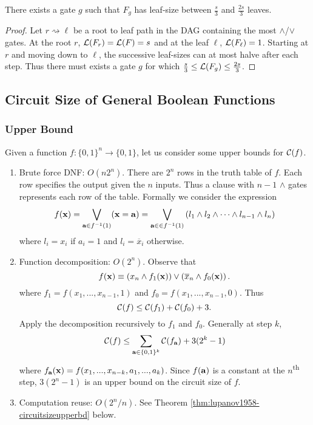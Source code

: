 \documentclass[11pt]{article}
\begin{document}
	\begin{claim}
		\label{claim:pickgoodgate}
		There exists a gate $g$ such that $F_g$ has leaf-size between $\frac{s}{3}$ and $\frac{2s}{3}$ leaves.
	\end{claim}
	\begin{proof}
		Let $r \rightsquigarrow \ell$ be a root to leaf path in the DAG containing the most $\land$/$\lor$ gates. At the root $r$, $\mathcal{L}(F_r) = \mathcal{L}(F) = s$ and at the leaf $\ell$, $\mathcal{L}(F_{\ell}) = 1$. Starting at $r$ and moving down to $\ell$, the successive leaf-sizes can at most halve after each step. Thus there must exists a gate $g$ for which $\frac{s}{3} \leq \mathcal{L}(F_g) \leq \frac{2s}{3}$.
	\end{proof}
	
	\subsection{Circuit Size of General Boolean Functions}
	\label{ssec:circuitsize}
	
	\subsubsection{Upper Bound}
	\label{sssec:circuitsizeupperbd}
	Given a function $f: \{0,1\}^n \rightarrow \{0,1\}$, let us consider some upper bounds for $\mathcal{C}(f)$.
	\begin{enumerate}
		\item Brute force DNF: $O(n2^n)$. There are $2^n$ rows in the truth table of $f$. Each row specifies the output given the $n$ inputs. Thus a clause with $n-1$ $\land$ gates represents each row of the table. Formally we consider the expression
		\[f(\mathbf{x}) = \bigvee_{\mathbf{a} \in f^{-1}(1)} (\mathbf{x} = \mathbf{a}) = \bigvee_{\mathbf{a} \in  \in f^{-1}(1)} \left(l_1 \land l_2 \land \cdots \land l_{n-1} \land l_n\right)\]
		where $l_i = x_i$ if $a_i = 1$ and $l_i = \overline{x}_i$ otherwise.
		\item Function decomposition: $O(2^n)$. Observe that 
		\[f(\mathbf{x}) \equiv \left(x_n \land f_1(\mathbf{x})\right) \lor \left(\overline{x}_n \land f_0(\mathbf{x})\right).\]
		where $f_1 = f(x_1, ..., x_{n-1}, 1)$ and $f_0 = f(x_1, ..., x_{n-1}, 0)$. Thus
		\[\mathcal{C}(f) \leq \mathcal{C}(f_1) + \mathcal{C}(f_0) + 3.\]
		Apply the decomposition recursively to $f_1$ and $f_0$. Generally at step $k$,
		\[\mathcal{C}(f) \leq \sum_{\mathbf{a} \in \{0,1\}^k}\mathcal{C}(f_{\mathbf{a}}) + 3(2^k - 1)\]
		where $f_{\mathbf{a}}(\mathbf{x}) = f(x_1, ..., x_{n-k}, a_1, ..., a_k)$. Since $f(\mathbf{a})$ is a constant at the $n$\textsuperscript{th} step, $3(2^n - 1)$ is an upper bound on the circuit size of $f$. 
		\item Computation reuse: $O(2^n/n)$. See Theorem \ref{thm:lupanov1958-circuitsizeupperbd} below. 
	\end{enumerate}
	
\end{document}
